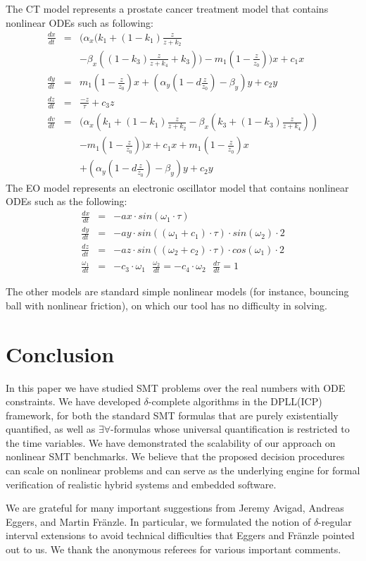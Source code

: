 \documentclass[12pt]{article}
\begin{document}
The CT model represents a prostate cancer treatment model that contains nonlinear ODEs such as following:
{\small
\begin{eqnarray*}
\frac{dx}{dt} &=& (\alpha_x
(k_1+(1-k_1)\frac{z}{z+k_2}\\
& &-\beta_x( (1-k_3)\frac{z}{z+k_4}+k_3)) - m_1(1-\frac{z}{z_0}))x + c_1 x\\
\frac{dy}{dt} &=& m_1(1-\frac{z}{z_0})x+(\alpha_y (1- d\frac{z}{z_0}) - \beta_y)y+c_2y\\
\frac{dz}{dt} &=& \frac{-z}{\tau} + c_3z\\
\frac{dv}{dt} &=& (\alpha_x
(k_1+(1-k_1)\frac{z}{z+k_2}-\beta_x(k_3+(1-k_3)\frac{z}{z+k_4}))\\
& &- m_1(1-\frac{z}{z_0}))x + c_1 x + m_1(1-\frac{z}{z_0})x\\
& &+(\alpha_y (1- d\frac{z}{z_0}) - \beta_y)y+c_2y
\end{eqnarray*}
}The EO model represents an electronic oscillator model that contains nonlinear ODEs such as the following:
{\small
\begin{eqnarray*}
\frac{dx}{dt} &=& - ax \cdot sin(\omega_1 \cdot \tau)\\
\frac{dy}{dt} &=& - ay \cdot sin( (\omega_1 + c_1) \cdot \tau) \cdot sin(\omega_2)\cdot 2\\
\frac{dz}{dt} &=& - az \cdot sin( (\omega_2 + c_2) \cdot \tau) \cdot cos(\omega_1)\cdot 2\\
\frac{\omega_1}{dt} &=& - c_3\cdot \omega_1\ \ \ \frac{\omega_2}{dt} = -c_4\cdot\omega_2\ \ \ \frac{d\tau}{dt} = 1
\end{eqnarray*}
}

The other models are standard simple nonlinear models (for instance, bouncing ball with nonlinear friction), on which our tool has no difficulty in solving.  

\section{Conclusion}\label{conclude}

In this paper we have studied SMT problems over the real numbers with ODE constraints. We have developed $\delta$-complete algorithms in the DPLL(ICP) framework, for both the standard SMT formulas that are purely existentially quantified, as well as $\exists\forall$-formulas whose universal quantification is restricted to the time variables. We have demonstrated the scalability of our approach on nonlinear SMT benchmarks. We believe that the proposed decision procedures can scale on nonlinear problems and can serve as the underlying engine for formal verification of realistic hybrid systems and embedded software.

 We are grateful for many important suggestions from Jeremy Avigad, Andreas Eggers, and Martin Fr\"anzle. In particular,  we formulated the notion of $\delta$-regular interval extensions to avoid technical difficulties that Eggers and Fr\"anzle pointed out to us. We thank the anonymous referees for various important comments. 

\end{document}
